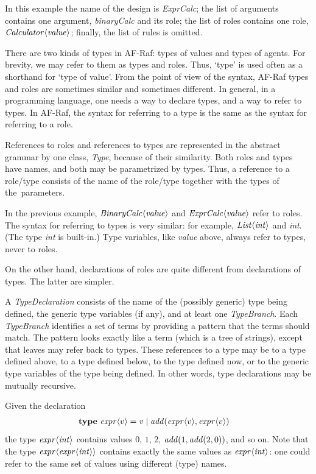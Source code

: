 \documentclass[a4paper,12pt,oneside,fleqn]{book} %
\begin{document}
{\begin{example}
In this example the name of the design is {\it ExprCalc\/}; the list of
arguments contains one argument, {\it binaryCalc\/} and its role; the list
of roles contains one role, $\it Calculator\langle value\rangle$; finally,
the list of rules is omitted.
\end{example}

There are two kinds of types in AF-Raf: types of values and types of
agents.  For brevity, we may refer to them as types and roles. Thus, `type'
is used often as a shorthand for `type of value'. From the point of view of
the syntax, AF-Raf types and roles are sometimes similar and sometimes
different. In general, in a programming language, one needs a way to
declare types, and a way to refer to types. In AF-Raf, the syntax for
referring to a type is the same as the syntax for referring to a role.

References to roles and references to types are represented in the abstract
grammar by one class, {\it Type}, because of their similarity. Both roles
and types have names, and both may be parametrized by types. Thus, a
reference to a role/type consists of the name of the role/type together
with the types of the~parameters.

\begin{example}
In the previous example, $\it BinaryCalc\langle value\rangle$ and $\it
ExprCalc\langle value\rangle$ refer to roles.  The syntax for referring to
types is very similar: for example, $\it List\langle int\rangle$ and {\it
int}. (The type {\it int\/} is built-in.) Type variables, like {\it value}
above, always refer to types, never to roles.
\end{example}

On the other hand, declarations of roles are quite different from
declarations of types. The latter are simpler.

A {\it TypeDeclaration\/} consists of the name of the (possibly generic)
type being defined, the generic type variables (if any), and at least one
{\it TypeBranch}. Each {\it TypeBranch\/} identifies a set of terms by
providing a pattern that the terms should match. The pattern looks exactly
like a term (which is a tree of strings), except that leaves may refer back
to types. These references to a type may be to a type defined above, to a
type defined below, to the type defined now, or to the generic type
variables of the type being defined. In other words, type declarations may
be mutually recursive.

\begin{example}
Given the declaration
\begin{align}
&{\bf type}\ {\it expr}\langle v\rangle
  = {\it v}
  \mid {\it add}({\it expr}\langle v\rangle, {\it expr}\langle v\rangle)
\end{align}
the type ${\it expr}\langle{\it int}\rangle$ contains values $0$, $1$, $2$,
${\it add}(1,{\it add}(2,0))$, and so on. Note that the type ${\it
expr}\langle{\it expr}\langle{\it int}\rangle\rangle$ contains exactly the
same values as ${\it expr}\langle{\it int}\rangle$: one could refer to the
same set of values using different (type) names.
\end{example}

}
\end{document}
